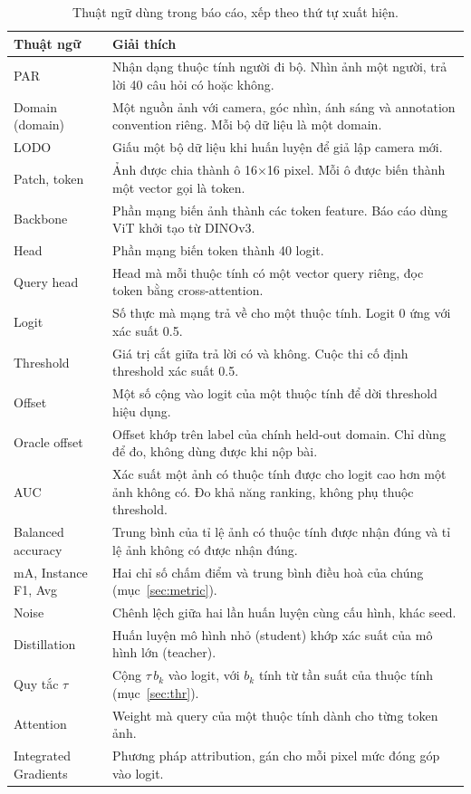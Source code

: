 \documentclass[11pt,a4paper]{article}
\begin{document}
\begin{table}[H]
\centering\small
\begin{tabularx}{\linewidth}{@{}lX@{}}
\toprule
Thuật ngữ & Giải thích \\
\midrule
PAR & Nhận dạng thuộc tính người đi bộ. Nhìn ảnh một người, trả lời 40 câu hỏi có hoặc không. \\
Domain (domain) & Một nguồn ảnh với camera, góc nhìn, ánh sáng và annotation convention riêng. Mỗi bộ dữ liệu là một domain. \\
LODO & Giấu một bộ dữ liệu khi huấn luyện để giả lập camera mới. \\
Patch, token & Ảnh được chia thành ô 16×16 pixel. Mỗi ô được biến thành một vector gọi là token. \\
Backbone & Phần mạng biến ảnh thành các token feature. Báo cáo dùng ViT khởi tạo từ DINOv3. \\
Head & Phần mạng biến token thành 40 logit. \\
Query head & Head mà mỗi thuộc tính có một vector query riêng, đọc token bằng cross-attention. \\
Logit & Số thực mà mạng trả về cho một thuộc tính. Logit 0 ứng với xác suất 0.5. \\
Threshold & Giá trị cắt giữa trả lời có và không. Cuộc thi cố định threshold xác suất 0.5. \\
Offset & Một số cộng vào logit của một thuộc tính để dời threshold hiệu dụng. \\
Oracle offset & Offset khớp trên label của chính held-out domain. Chỉ dùng để đo, không dùng được khi nộp bài. \\
AUC & Xác suất một ảnh có thuộc tính được cho logit cao hơn một ảnh không có. Đo khả năng ranking, không phụ thuộc threshold. \\
Balanced accuracy & Trung bình của tỉ lệ ảnh có thuộc tính được nhận đúng và tỉ lệ ảnh không có được nhận đúng. \\
mA, Instance F1, Avg & Hai chỉ số chấm điểm và trung bình điều hoà của chúng (mục~\ref{sec:metric}). \\
Noise & Chênh lệch giữa hai lần huấn luyện cùng cấu hình, khác seed. \\
Distillation & Huấn luyện mô hình nhỏ (student) khớp xác suất của mô hình lớn (teacher). \\
Quy tắc $\tau$ & Cộng $\tau\,b_k$ vào logit, với $b_k$ tính từ tần suất của thuộc tính (mục~\ref{sec:thr}). \\
Attention & Weight mà query của một thuộc tính dành cho từng token ảnh. \\
Integrated Gradients & Phương pháp attribution, gán cho mỗi pixel mức đóng góp vào logit. \\
\bottomrule
\end{tabularx}
\caption{Thuật ngữ dùng trong báo cáo, xếp theo thứ tự xuất hiện.}
\end{table}
\end{document}
